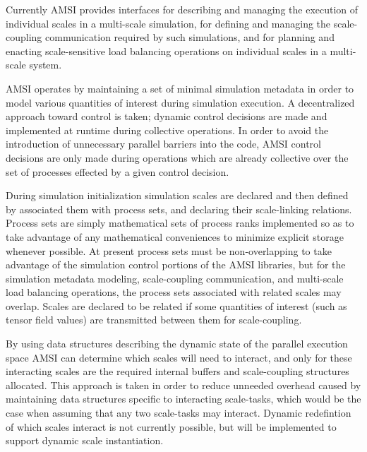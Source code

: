 Currently AMSI provides interfaces for describing and managing the execution of individual scales in a multi-scale simulation, for defining and managing the scale-coupling communication required by such simulations, and for planning and enacting scale-sensitive load balancing operations on individual scales in a multi-scale system.

AMSI operates by maintaining a set of minimal simulation metadata in order to model various quantities of interest during simulation execution. A decentralized approach toward control is taken; dynamic control decisions are made and implemented at runtime during collective operations. In order to avoid the introduction of unnecessary parallel barriers into the code, AMSI control decisions are only made during operations which are already collective over the set of processes effected by a given control decision.

\label{amsi-scales}
During simulation initialization simulation scales are declared and then defined by associated them with process sets, and declaring their scale-linking relations. Process sets are simply mathematical sets of process ranks implemented so as to take advantage of any mathematical conveniences to minimize explicit storage whenever possible. At present process sets must be non-overlapping to take advantage of the simulation control portions of the AMSI libraries, but for the simulation metadata modeling, scale-coupling communication, and multi-scale load balancing operations, the process sets associated with related scales may overlap. Scales are declared to be related if some quantities of interest (such as tensor field values) are transmitted between them for scale-coupling.

\label{amsi-communication}
By using data structures describing the dynamic state of the parallel execution space AMSI can determine which scales will need to interact, and only for these interacting scales are the required internal buffers and scale-coupling structures allocated. This approach is taken in order to reduce unneeded overhead caused by maintaining data structures specific to interacting scale-tasks, which would be the case when assuming that any two scale-tasks may interact. Dynamic redefintion of which scales interact is not currently possible, but will be implemented to support dynamic scale instantiation.

